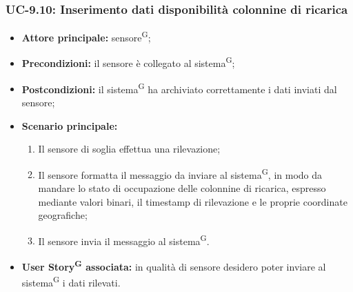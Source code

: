 \documentclass[8pt]{article}
\newcommand{\glossterm}[1]{#1\textsuperscript{G}} %
\begin{document}
\subsubsection*{UC-9.10: Inserimento dati disponibilità colonnine di ricarica}
\begin{itemize}
    \item \textbf{Attore principale:} \glossterm{sensore};
    \item \textbf{Precondizioni:} il sensore è collegato al \glossterm{sistema};
    \item \textbf{Postcondizioni:} il \glossterm{sistema} ha archiviato correttamente i dati inviati dal sensore;
    \item \textbf{Scenario principale:}
        \begin{enumerate}
        \item Il sensore di soglia effettua una rilevazione;
        \item Il sensore formatta il messaggio da inviare al \glossterm{sistema}, in modo da mandare lo stato di occupazione delle colonnine di ricarica, espresso mediante valori binari, il timestamp di rilevazione e le proprie coordinate geografiche;
        \item Il sensore invia il messaggio al \glossterm{sistema}.
        \end{enumerate}
    \item \textbf{\glossterm{User Story} associata:} in qualità di sensore desidero poter inviare al \glossterm{sistema} i dati rilevati.
\end{itemize}
\end{document}
